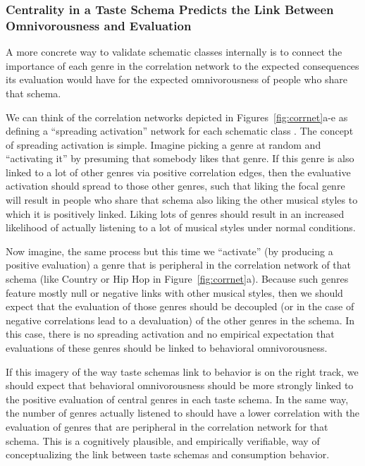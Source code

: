 \documentclass[preprint, authoryear,11pt, 3p]{elsarticle}
\begin{document}
\subsubsection{Centrality in a Taste Schema Predicts the Link Between Omnivorousness and Evaluation}
A more concrete way to validate schematic classes internally is to connect the importance of each genre in the correlation network to the expected consequences its evaluation would have for the expected omnivorousness of people who share that schema. 

We can think of the correlation networks depicted in Figures~\ref{fig:corrnet}a-e as defining a ``spreading activation'' network for each schematic class \citep{collins1975spreading}. The concept of spreading activation is simple. Imagine picking a genre at random and ``activating it'' by presuming that somebody likes that genre. If this genre is also linked to a lot of other genres via positive correlation edges, then the evaluative activation should spread to those other genres, such that liking the focal genre will result in people who share that schema also liking the other musical styles to which it is positively linked. Liking lots of genres should result in an increased likelihood of actually listening to a lot of musical styles under normal conditions. 

Now imagine, the same process but this time we ``activate'' (by producing a positive evaluation) a genre that is peripheral in the correlation network of that schema (like Country or Hip Hop in Figure~\ref{fig:corrnet}a). Because such genres feature mostly null or negative links with other musical styles, then we should expect that the evaluation of those genres should be decoupled (or in the case of negative correlations lead to a devaluation) of the other genres in the schema. In this case, there is no spreading activation and no empirical expectation that evaluations of these genres should be linked to behavioral omnivorousness. 

If this imagery of the way taste schemas link to behavior is on the right track, we should expect that behavioral omnivorousness should be more strongly linked to the positive evaluation of central genres in each taste schema. In the same way, the number of genres actually listened to should have a lower correlation with the evaluation of genres that are peripheral in the correlation network for that schema. This is a cognitively plausible, and empirically verifiable, way of conceptualizing the link between taste schemas and consumption behavior. 
\end{document}
